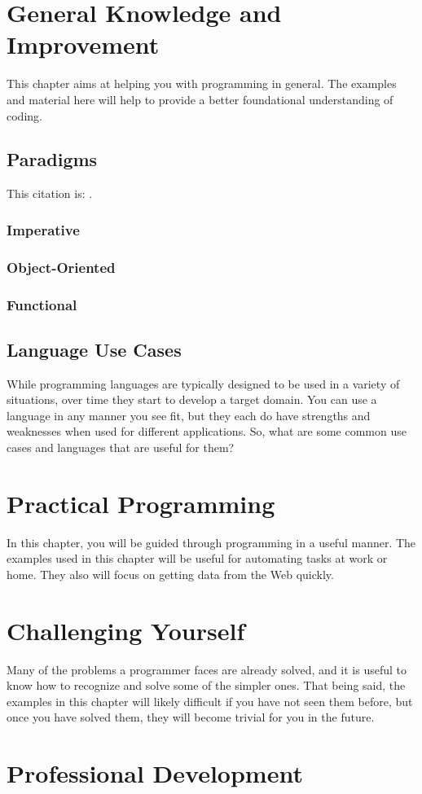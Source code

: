 \documentclass[12pt, oneside, a4paper]{book}
\begin{document}
   \chapter{General Knowledge and Improvement}
   \label{chap:general}
      This chapter aims at helping you with programming in general.
      The examples and material here will help to provide a better foundational understanding of coding.

      \section{Paradigms}
      This citation is: \autocite{Paradigms}.
      \subsection{Imperative}
      \subsection{Object-Oriented}
      \subsection{Functional}
      \section{Language Use Cases}
         While programming languages are typically designed to be used in a variety of situations, over time they start to develop a target domain.
         You can use a language in any manner you see fit, but they each do have strengths and weaknesses when used for different applications.
         So, what are some common use cases and languages that are useful for them?

   \chapter{Practical Programming}
   \label{chap:practical}
      In this chapter, you will be guided through programming in a useful manner.
      The examples used in this chapter will be useful for automating tasks at work or home.
      They also will focus on getting data from the Web quickly.
   \chapter{Challenging Yourself}
      Many of the problems a programmer faces are already solved, and it is useful to know how to recognize and solve some of the simpler ones.
      That being said, the examples in this chapter will likely difficult if you have not seen them before, but once you have solved them, they will become trivial for you in the future.
   \label{chap:challenge}
   \chapter{Professional Development}
   \label{chap:prof_devel}

\newpage
\printbibliography[heading=bibintoc]
\end{document}
